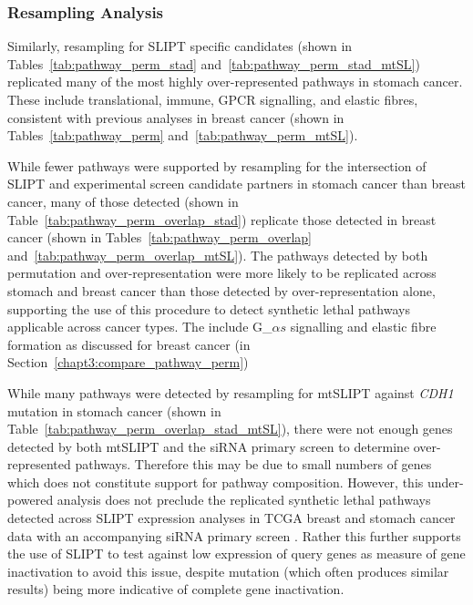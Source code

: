 \FloatBarrier

\subsubsection{Resampling Analysis}  \label{chapt3:compare_pathway_perm_stad_SL}

Similarly, resampling for SLIPT specific candidates (shown in Tables~\ref{tab:pathway_perm_stad} and~\ref{tab:pathway_perm_stad_mtSL}) replicated many of the most highly over-represented pathways in stomach cancer. These include translational, immune, GPCR signalling, and elastic fibres, consistent with previous analyses in breast cancer (shown in Tables~\ref{tab:pathway_perm} and~\ref{tab:pathway_perm_mtSL}).

While fewer pathways were supported by resampling for the intersection of SLIPT and experimental screen \citep{Telford2015} candidate partners in stomach cancer than breast cancer, many of those detected (shown in Table~\ref{tab:pathway_perm_overlap_stad}) replicate those detected in breast cancer (shown in Tables~\ref{tab:pathway_perm_overlap} and~\ref{tab:pathway_perm_overlap_mtSL}). The pathways detected by both permutation and over-representation were more likely to be replicated across stomach and breast cancer than those detected by over-representation alone, supporting the use of this procedure to detect synthetic lethal pathways applicable across cancer types. The include G_${\alpha s}$ signalling and elastic fibre formation as discussed for breast cancer (in Section~\ref{chapt3:compare_pathway_perm})

While many pathways were detected by resampling for mtSLIPT against \textit{CDH1} mutation in stomach cancer (shown in Table~\ref{tab:pathway_perm_overlap_stad_mtSL}), there were not enough genes detected by both mtSLIPT and the siRNA primary screen to determine over-represented pathways. Therefore this may be due to small numbers of genes which does not constitute support for pathway composition. However, this under-powered analysis does not preclude the replicated synthetic lethal pathways detected across SLIPT expression analyses in TCGA breast and stomach cancer data with an accompanying siRNA primary screen \citep{Telford2015}. Rather this further supports the use of SLIPT to test against low expression of query genes as measure of gene inactivation to avoid this issue, despite mutation (which often produces similar results) being more indicative of complete gene inactivation.

\FloatBarrier

